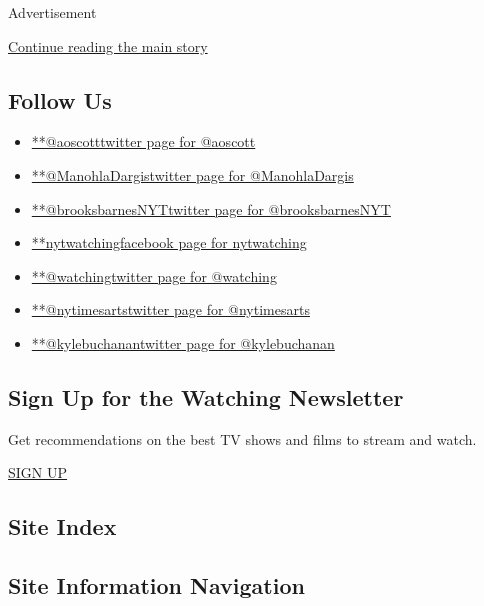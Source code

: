 Advertisement

\protect\hyperlink{after-mktg}{Continue reading the main story}

\hypertarget{follow-us}{%
\subsection{Follow Us}\label{follow-us}}

\begin{itemize}
\tightlist
\item
  \href{https://twitter.com/aoscott}{**@aoscotttwitter page for
  @aoscott}
\item
  \href{https://twitter.com/ManohlaDargis}{**@ManohlaDargistwitter page
  for @ManohlaDargis}
\item
  \href{https://twitter.com/brooksbarnesNYT}{**@brooksbarnesNYTtwitter
  page for @brooksbarnesNYT}
\item
  \href{https://www.facebookcorewwwi.onion/nytwatching}{**nytwatchingfacebook
  page for nytwatching}
\item
  \href{https://twitter.com/watching}{**@watchingtwitter page for
  @watching}
\item
  \href{https://twitter.com/nytimesarts}{**@nytimesartstwitter page for
  @nytimesarts}
\item
  \href{https://twitter.com/kylebuchanan}{**@kylebuchanantwitter page
  for @kylebuchanan}
\end{itemize}

\hypertarget{sign-up-for-the-watching-newsletter}{%
\subsection{Sign Up for the Watching
Newsletter}\label{sign-up-for-the-watching-newsletter}}

Get recommendations on the best TV shows and films to stream and watch.

\href{/newsletters/signup/WG}{SIGN UP}

\hypertarget{site-index}{%
\subsection{Site Index}\label{site-index}}

\hypertarget{site-information-navigation}{%
\subsection{Site Information
Navigation}\label{site-information-navigation}}

